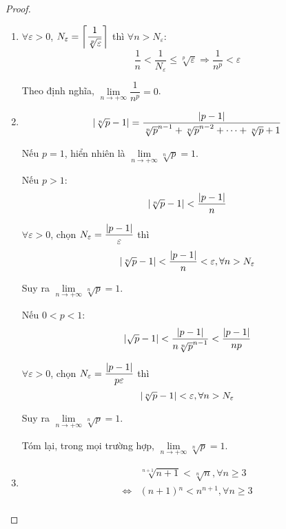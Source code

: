 \documentclass[class=analysis,crop=false]{standalone}
\begin{document}
\begin{proof}
    \begin{enumerate}[label = (\roman*)]
        \item $\forall\varepsilon > 0$, $N_{\varepsilon} = \left\lceil{\dfrac{1}{\sqrt[p]{\varepsilon}}}\right\rceil$ thì $\forall n > N_{\varepsilon}$:
              \[
                  \frac{1}{n} < \frac{1}{N_{\varepsilon}} \le \sqrt[p]{\varepsilon} \Longrightarrow \frac{1}{n^{p}} < \varepsilon
              \]
              \par Theo định nghĩa, $\lim\limits_{n\to+\infty} \dfrac{1}{n^{p}} = 0$.
        \item
              \[
                  \left\vert{\sqrt[n]{p} - 1}\right\vert = \frac{\left\vert{p-1}\right\vert}{\sqrt[n]{p}^{n-1} + \sqrt[n]{p}^{n-2} + \cdots + \sqrt[n]{p} + 1}
              \]
              \par Nếu $p = 1$, hiển nhiên là $\lim\limits_{n\to+\infty} \sqrt[n]{p} = 1$.
              \par Nếu $p > 1$:
              \[
                  \left\vert{\sqrt[n]{p} - 1}\right\vert < \frac{\left\vert{p-1}\right\vert}{n}
              \]
              \par$\forall\varepsilon > 0$, chọn $N_{\varepsilon} = \dfrac{\left\vert{p-1}\right\vert}{\varepsilon}$ thì
              \[
                  \left\vert{\sqrt[n]{p} - 1}\right\vert < \frac{\left\vert{p-1}\right\vert}{n} < \varepsilon, \forall n > N_{\varepsilon}
              \]
              \par Suy ra $\lim\limits_{n\to+\infty} \sqrt[n]{p} = 1$.
              \par Nếu $0 < p < 1$:
              \[
                  \left\vert{\sqrt{p} - 1}\right\vert < \frac{\left\vert{p-1}\right\vert}{n\sqrt[n]{p}^{n-1}} < \frac{\left\vert{p-1}\right\vert}{np}
              \]
              \par$\forall\varepsilon > 0$, chọn $N_{\varepsilon} = \dfrac{\left\vert{p-1}\right\vert}{p\varepsilon}$ thì
              \[
                  \left\vert{\sqrt[n]{p} - 1}\right\vert < \varepsilon, \forall n > N_{\varepsilon}
              \]
              \par Suy ra $\lim\limits_{n\to+\infty} \sqrt[n]{p} = 1$.
              \par Tóm lại, trong mọi trường hợp, $\lim\limits_{n\to+\infty} \sqrt[n]{p} = 1$.
        \item
              \begin{align*}
                                  & \sqrt[n+1]{n+1} < \sqrt[n]{n}, \forall n\ge 3        \\
                  \Leftrightarrow & (n+1){}^{n} < n^{n+1}, \forall n\ge 3                \\

\end{align*}
\end{enumerate}
\end{proof}
\end{document}

